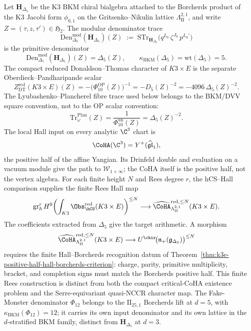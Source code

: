 \begin{theorem}
\label{rem:modtr-bkm-shadow}
\label{thm:modtr-primitive-compact-traces}
Let $\mathbf H_{\Delta_5}$ be the K3 BKM chiral bialgebra attached to
the Borcherds product of the K3 Jacobi form $\phi_{0,1}$ on the
Gritsenko--Nikulin lattice $\Lambda^{2,1}_{\mathrm{II}}$, and write
$Z=(\tau,z,\tau')\in\mathfrak H_2$. The modular denominator trace
\[
\mathrm{Den}^{\mathrm{mod}}_{\Delta_5}(\mathbf H_{\Delta_5})(Z)
\;:=\;
\mathrm{STr}_{\mathbf H_{\Delta_5}}\!
\bigl(q^{L_0}\,\zeta^{J_0}\,p^{L_0'}\bigr)
\]
is the primitive denominator
\[
 \mathrm{Den}^{\mathrm{mod}}_{\Delta_5}(\mathbf H_{\Delta_5})(Z)
 = \Delta_5(Z),
 \qquad
 \kappa_{\mathrm{BKM}}(\Delta_5)
 = \mathrm{wt}(\Delta_5)=5.
\]
The compact reduced Donaldson--Thomas character of $K3\times E$ is the
separate Oberdieck--Pandharipande scalar
\[
 Z^{\mathrm{red}}_{\mathrm{DT}}(K3\times E)(Z)
 = -\bigl(\Phi_{10}^{\mathrm{OP}}(Z)\bigr)^{-1}
 = -D_5(Z)^{-2}
 = -4096\,\Delta_5(Z)^{-2}.
\]
The Lyubashenko--Plancherel fibre trace used below belongs to the
BKM/DVV square convention, not to the OP scalar convention:
\[
 \mathrm{Tr}^{\mathrm{Plan}}_{\omega}(Z)
 =\frac{1}{\Phi_{10}^{\mathrm{un}}(Z)}
 =\Delta_5(Z)^{-2}.
\]
The local Hall input on every analytic $\C^3$ chart is
\[
 \CoHA(\C^3)=Y^+(\widehat{\mathfrak{gl}}_1),
\]
the positive half of the affine Yangian. Its Drinfeld double and
evaluation on a vacuum module give the path to
$\mathcal{W}_{1+\infty}$; the CoHA itself is the positive half, not the
vertex algebra. For each finite height $N$ and Rees degree $r$, the
hCS--Hall comparison supplies the finite Rees Hall map
\[
 \mathrm{gr}^{r}_{\hbar}\,
 H^0\!\left(\int_{K3}\Obs_{\hCS}^{\mathrm{red}}(K3\times E)\right)^{\le N}
 \longrightarrow
 \widehat{\CoHA}^{\mathrm{red},\le N}_{\Lambda^{2,1}_{\mathrm{II}}}(K3\times E).
\]
The coefficients extracted from $\Delta_5$ give the target arithmetic. A
morphism
\[
 \widehat{\CoHA}^{\mathrm{red},\le N}_{\Lambda^{2,1}_{\mathrm{II}}}(K3\times E)
 \longrightarrow
 U^{\chir}\!\bigl(\mathfrak n_+(\mathfrak g_{\Delta_5})\bigr)^{\le N}
\]
requires the finite Hall--Borcherds recognition datum of
Theorem~\ref{thm:k3e-positive-half-hall-borcherds-criterion}: charge,
parity, primitive multiplicity, bracket, and completion signs must match
the Borcherds positive half.
This finite Rees construction is distinct from both the compact
critical-CoHA existence problem and the Serre-equivariant quasi-NCCR
character map. The Fake-Monster denominator $\Phi_{12}$ belongs to
the $\mathrm{II}_{25, 1}$ Borcherds lift at $d = 5$, with
$\kappa_{\mathrm{BKM}}(\Phi_{12}) = 12$; it carries its own input
denominator and its own lattice in the $d$-stratified BKM family,
distinct from
$\mathbf H_{\Delta_5}$ at $d = 3$.
\end{theorem}

